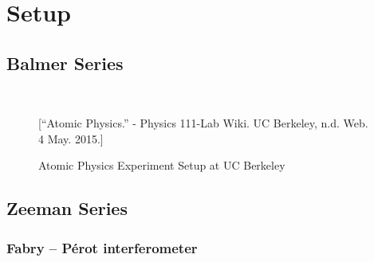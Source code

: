 \section{Setup}
\subsection{Balmer Series}

\begin{figure}[ht]
  \begin{center}
     \\
  \end{center}
  \caption{Atomic Physics Experiment Setup at UC Berkeley}[\footnotesize{``Atomic Physics.'' - Physics 111-Lab Wiki. UC Berkeley, n.d. Web. 4 May. 2015.}]
  \label{ThreeFigs}
\end{figure}

\subsection{Zeeman Series}
\subsubsection{Fabry -- P\'{e}rot interferometer} \label{FPI}

